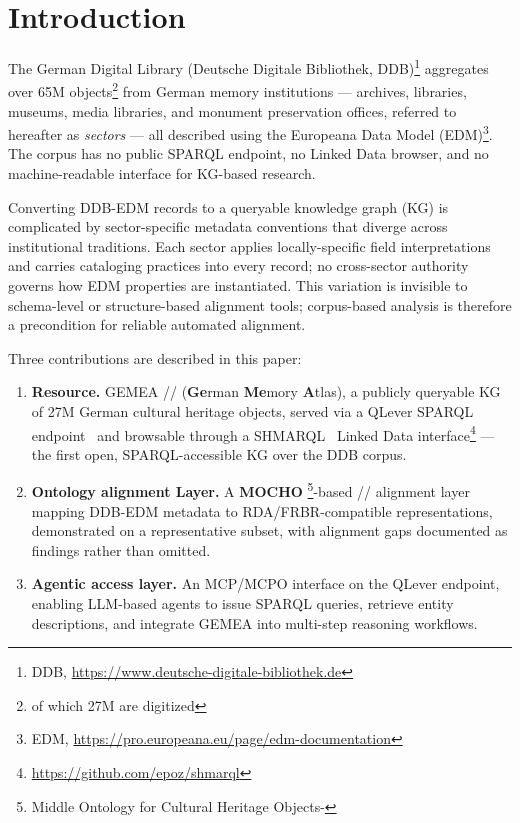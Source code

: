 
\section{Introduction}
\label{sec:introduction}

The German Digital Library (Deutsche Digitale Bibliothek, DDB)\footnote{DDB, \url{https://www.deutsche-digitale-bibliothek.de}} aggregates over 65M objects\footnote{of which 27M are digitized} from German memory institutions --- archives, libraries, museums, media libraries, and monument preservation offices, referred to hereafter as \emph{sectors} --- all described using the Europeana Data Model (EDM)\footnote{EDM, \url{https://pro.europeana.eu/page/edm-documentation}}.
The corpus has no public SPARQL endpoint, no Linked Data browser, and no machine-readable interface for KG-based research.

Converting DDB-EDM records to a queryable knowledge graph (KG) is complicated by sector-specific metadata conventions that diverge across institutional traditions.
Each sector applies locally-specific field interpretations and carries cataloging practices into every record; no cross-sector authority governs how EDM properties are instantiated.
This variation is invisible to schema-level or structure-based alignment tools; corpus-based analysis is therefore a precondition for reliable automated alignment.

Three contributions are described in this paper:

\begin{enumerate}
    \item \textbf{Resource.} GEMEA //
(\textbf{Ge}rman \textbf{Me}mory \textbf{A}tlas), a publicly queryable KG of 27M German cultural heritage objects, served via a QLever SPARQL endpoint~\cite{bast2017qlever} and browsable through a SHMARQL~\cite{shmarql} Linked Data interface\footnote{\url{https://github.com/epoz/shmarql}} --- the first open, SPARQL-accessible KG over the DDB corpus.

    \item \textbf{Ontology alignment Layer.} A \textbf{MOCHO} \footnote{Middle Ontology for Cultural Heritage Objects-}-based\cite{tan2026navigating} // alignment layer mapping DDB-EDM metadata to RDA/FRBR-compatible representations, demonstrated on a representative subset, with alignment gaps documented as findings rather than omitted.

    \item \textbf{Agentic access layer.} An MCP/MCPO interface on the QLever endpoint, enabling LLM-based agents to issue SPARQL queries, retrieve entity descriptions, and integrate GEMEA into multi-step reasoning workflows.
\end{enumerate}


